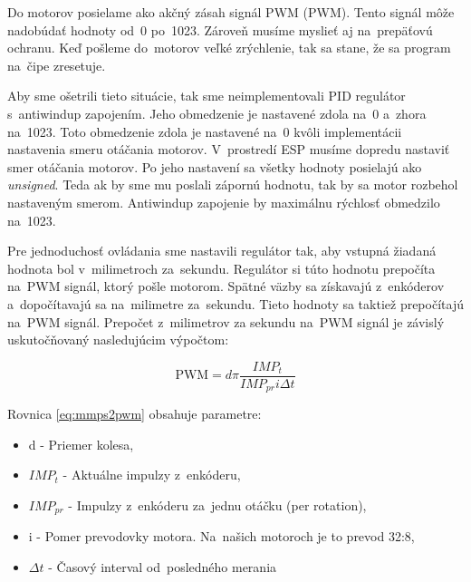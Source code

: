 Do motorov posielame ako akčný zásah signál PWM (\acrlong{PWM}). Tento signál môže nadobúdať hodnoty od~0 po~1023.
Zároveň musíme myslieť aj na~prepäťovú ochranu. Keď pošleme do~motorov veľké zrýchlenie, tak sa stane, že sa program
na~čipe zresetuje.

Aby sme ošetrili tieto situácie, tak sme neimplementovali PID regulátor s~antiwindup zapojením. Jeho obmedzenie je
nastavené zdola na~0 a~zhora na~1023. Toto obmedzenie zdola je nastavené na~0 kvôli implementácii nastavenia smeru
otáčania motorov. V~prostredí ESP musíme dopredu nastaviť smer otáčania motorov. Po jeho nastavení sa všetky hodnoty
posielajú ako \textit{unsigned}. Teda ak by sme mu poslali zápornú hodnotu, tak by sa motor rozbehol nastaveným smerom.
Antiwindup zapojenie by maximálnu rýchlosť obmedzilo na~1023.

Pre jednoduchosť ovládania sme nastavili regulátor tak, aby vstupná žiadaná hodnota bol v~milimetroch za~sekundu.
Regulátor si túto hodnotu prepočíta na~PWM signál, ktorý pošle motorom. Spätné väzby sa získavajú z~enkóderov
a~dopočítavajú sa na~milimetre za~sekundu. Tieto hodnoty sa taktiež prepočítajú na~PWM signál. Prepočet z~milimetrov
za sekundu na~PWM signál je závislý uskutočňovaný nasledujúcim výpočtom:

\begin{equation}
	\text{PWM} = d \pi \frac{IMP_t}{IMP_{pr} i \Delta t}
	\label{eq:mmps2pwm}
\end{equation}

Rovnica \ref{eq:mmps2pwm} obsahuje parametre:
\begin{itemize}
	\item d - Priemer kolesa,
	\item $IMP_t$ - Aktuálne impulzy z~enkóderu,
	\item $IMP_{pr}$ - Impulzy z~enkóderu za~jednu otáčku (per rotation),
	\item i - Pomer prevodovky motora. Na~našich motoroch je to prevod 32:8,
	\item $\Delta t$ - Časový interval od~posledného merania
\end{itemize}

